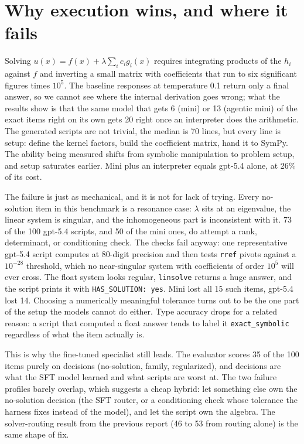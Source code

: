 \documentclass[11pt]{article}
\begin{document}
\section{Why execution wins, and where it fails}
Solving $u(x) = f(x) + \lambda \sum_i c_i g_i(x)$ requires integrating
products of the $h_i$ against $f$ and inverting a small matrix with
coefficients that run to six significant figures times $10^5$. The baseline
responses at temperature 0.1 return only a final answer, so we cannot see
where the internal derivation goes wrong; what the results show is that the
same model that gets 6 (mini) or 13 (agentic mini) of the exact items right
on its own gets 20 right once an interpreter does the arithmetic. The
generated scripts are not trivial, the median is 70 lines, but every line is
setup: define the kernel factors, build the coefficient matrix, hand it to
SymPy. The ability being measured shifts from symbolic manipulation to
problem setup, and setup saturates earlier. Mini plus an interpreter equals
gpt-5.4 alone, at 26\% of its cost.

The failure is just as mechanical, and it is not for lack of trying. Every
no-solution item in this benchmark is a resonance case: $\lambda$ sits at an
eigenvalue, the linear system is singular, and the inhomogeneous part is
inconsistent with it. 73 of the 100 gpt-5.4 scripts, and 50 of the mini
ones, do attempt a rank, determinant, or conditioning check. The checks
fail anyway: one representative gpt-5.4 script computes at 80-digit
precision and then tests \texttt{rref} pivots against a $10^{-28}$
threshold, which no near-singular system with coefficients of order $10^5$
will ever cross. The float system looks regular, \texttt{linsolve} returns a
huge answer, and the script prints it with \texttt{HAS\_SOLUTION: yes}. Mini
lost all 15 such items, gpt-5.4 lost 14. Choosing a numerically meaningful
tolerance turns out to be the one part of the setup the models cannot do
either. Type accuracy drops for a related reason: a script that computed a
float answer tends to label it \texttt{exact\_symbolic} regardless of what
the item actually is.

This is why the fine-tuned specialist still leads. The evaluator scores 35 of
the 100 items purely on decisions (no-solution, family, regularized), and
decisions are what the SFT model learned and what scripts are worst at. The
two failure profiles barely overlap, which suggests a cheap hybrid: let
something else own the no-solution decision (the SFT router, or a
conditioning check whose tolerance the harness fixes instead of the model),
and let the script own the algebra. The solver-routing
result from the previous report (46 to 53 from routing alone) is the same
shape of fix.
\end{document}
